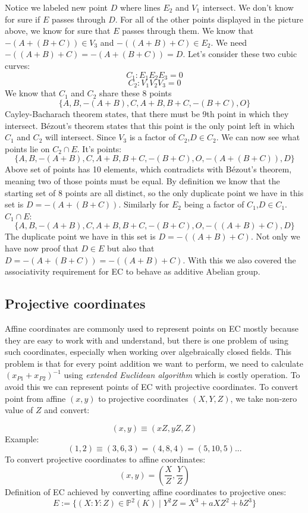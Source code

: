 \documentclass[bp,en]{FEIstyle}
\begin{document}
Notice we labeled new point $D$ where lines $E_2$ and $V_1$ intersect. We don't know for sure if $E$ passes through $D$. For all of the other points displayed in the picture above, we know for sure that $E$ passes through them. We know that $-(A+(B+C)) \in V_3$ and $-((A+B)+C) \in E_2$. We need $-((A+B)+C) = -(A+(B+C))=D$. Let's consider these two cubic curves:
\[
C_1: E_1E_2E_3=0
\]
\[
C_2: V_1V_2V_3=0
\]
We know that $C_1$ and $C_2$ share these 8 points 
\[
\{A,B,-(A+B),C,A+B,B+C,-(B+C),O\}
\]
Cayley-Bacharach theorem states, that there must be 9th point in which they intersect. Bézout's theorem states that this point is the only point left in which $C_1$ and $C_2$ will intersect. Since $V_3$ is a factor of $C_2$,$D\in C_2$. We can now see what points lie on  $C_2\cap E$. It's points:
\[
\{A,B,-(A+B),C,A+B,B+C,-(B+C),O,-(A+(B+C)), D\}
\]
Above set of points has 10 elements, which contradicts with Bézout's theorem, meaning two of those points must be equal. By definition we know that the starting set of 8 points are all distinct, so the only duplicate point we have in this set is $D=-(A+(B+C))$. Similarly for $E_2$ being a factor of $C_1$,$D\in C_1$. \\$C_1\cap E$:
\[
\{A,B,-(A+B),C,A+B,B+C,-(B+C),O,-((A+B)+C), D\}
\]
The duplicate point we have in this set is $D=-((A+B)+C)$. Not only we have now proof that $D\in E$ but also that $D=-(A+(B+C))=-((A+B)+C)$. With this we also covered the associativity requirement for EC to behave as additive Abelian group.

\newpage
\subsection*{Projective coordinates}
 Affine coordinates are commonly used to represent points on EC mostly because they are easy to work with and understand, but there is one problem of using such coordinates, especially when working over algebraically closed fields. This problem is that for every point addition we want to perform, we need to calculate $(x_{P1}+x_{P2})^{-1}$ using \textit{extended Euclidean algorithm} which is costly operation. To avoid this we can represent points of EC with projective coordinates. To convert point from affine $(x,y)$ to projective coordinates $(X,Y,Z)$, we take non-zero value of $Z$ and convert:

 \[
 (x,y) \equiv (xZ,yZ,Z)
 \]
 Example:
 \[
 (1,2) \equiv (3,6,3) = (4,8,4) = (5,10,5) ...
 \]
To convert projective coordinates to affine coordinates:
\[
(x,y) = (\frac{X}{Z},\frac{Y}{Z})
\]
 Definition of EC achieved by converting affine coordinates to projective ones:
\[
E:={\{ (X:Y:Z) \in \mathbb{P}^2(K) \mid Y^2Z=X^3 + aXZ^2+bZ^3\}}
\]
\end{document}
